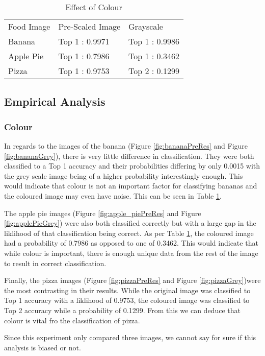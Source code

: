 \begin{table}[]
\centering
\caption{Effect of Colour}
\label{colour}
\begin{tabular}{lll}
Food Image & Pre-Scaled Image & Grayscale      \\
Banana     & Top 1 : 0.9971   & Top 1 : 0.9986 \\
Apple Pie  & Top 1 : 0.7986   & Top 1 : 0.3462   \\
Pizza      & Top 1 : 0.9753   & Top 2 : 0.1299
\end{tabular}
\end{table}

\subsection*{Empirical Analysis}
\subsubsection*{Colour}
In regards to the images of the banana (Figure \ref{fig:bananaPreRes} and Figure \ref{fig:bananaGrey}), there is very little difference in classification. They were both classified to a Top 1 accuracy and their probabilities differing by only 0.0015 with the grey scale image being of a higher probability interestingly enough. This would indicate that colour is not an important factor for classifying bananas and the coloured image may even have noise. This can be seen in Table \ref{colour}.

The apple pie images (Figure \ref{fig:apple_piePreRes} and Figure \ref{fig:applePieGrey}) were also both classified correctly but with a large gap in the liklihood of that classification being correct. As per Table \ref{colour}, the coloured image had a probability of 0.7986 as opposed to one of 0.3462. This would indicate that while colour is important, there is enough unique data from the rest of the image to result in correct classification.

Finally, the pizza images (Figure \ref{fig:pizzaPreRes} and Figure \ref{fig:pizzaGrey})were the most contrasting in their results. While the original image was classified to Top 1 accuracy with a liklihood of 0.9753, the coloured image was classified to Top 2 accuracy while a probability of 0.1299. From this we can deduce that colour is vital fro the classification of pizza.

Since this experiment only compared three images, we cannot say for sure if this analysis is biased or not.

